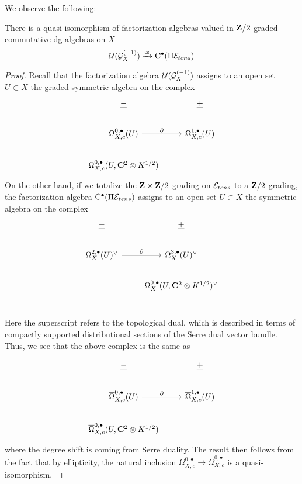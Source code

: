 \documentclass[../main.tex]{subfiles}
\begin{document}
We observe the following:
\begin{prop}
\label{prop:factabelian}
There is a quasi-isomorphism of factorization algebras valued in $\mathbf{Z}/2$ graded commutative dg algebras on $X$
\[
\mathcal{U} (\mathcal{G}^{(-1)}_{X} )\xrightarrow{\simeq} {\mathrm{C}}^\bullet(\Pi \mathcal{E}_{tens})
\]
\end{prop}

\begin{proof}
Recall that the factorization algebra $\mathcal{U}(\mathcal{G}_{X}^{(-1)})$ assigns to an open set $U\subset X$ the graded symmetric algebra on the complex
\begin{equation}\label{eqn:weight-1}
\begin{tikzcd}
\ul{-} & \ul{+}\\
\Omega_{X, c}^{0,\bullet}(U) \ar[r,"\del"] & \Omega_{X, c}^{1,\bullet}(U) \\
\Omega_{X, c}^{0,\bullet}(U, \C^2\otimes K^{1/2}) & 
\end{tikzcd}
\end{equation}
On the other hand, if we totalize the $\mathbf{Z}\times\mathbf{Z}/2$-grading on $\mathcal{E}_{tens}$ to a $\mathbf{Z}/2$-grading, the factorization algebra ${\mathrm{C}}^\bullet (\Pi \mathcal{E}_{tens})$ assigns to an open set $U\subset X$ the symmetric algebra on the complex 
\begin{equation}
\begin{tikzcd}
\ul{-} & \ul{+}\\
\Omega_{X}^{2,\bullet}(U)^\vee \ar[r,"\del"] & \Omega_{X}^{3,\bullet}(U)^\vee \\
& \Omega_{X}^{0,\bullet}(U, \C^2\otimes K^{1/2})^\vee \\
\end{tikzcd}
\end{equation}

Here the superscript refers to the topological dual, which is described in terms of compactly supported distributional sections of the Serre dual vector bundle. Thus, we see that the above complex is the same as 

\begin{equation}
\begin{tikzcd}
\ul{-} & \ul{+}\\
\overline \Omega_{X, c}^{0,\bullet}(U) \ar[r,"\del"] & \overline \Omega_{X, c}^{1,\bullet}(U) \\
\overline \Omega_{X, c}^{0,\bullet}(U, \C^2\otimes K^{1/2}) & 
\end{tikzcd}
\end{equation}
where the degree shift is coming from Serre duality. The result then follows from the fact that by ellipticity, the natural inclusion $\Omega^{0,\bullet}_{X,c}\to\overline \Omega^{0,\bullet}_{X,c}$ is a quasi-isomorphism.
\end{proof}
\end{document}
